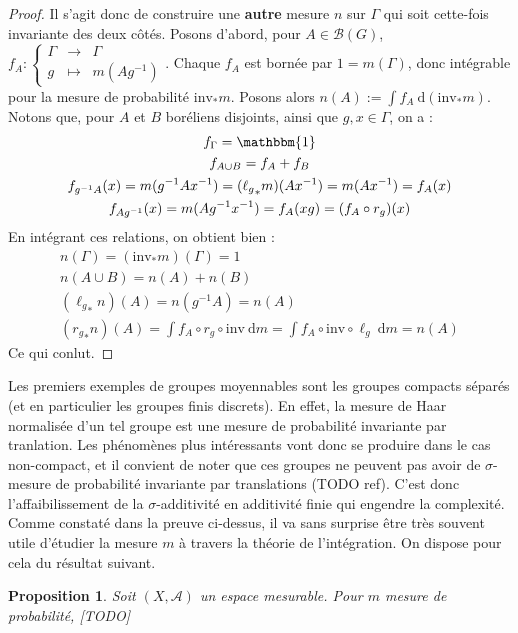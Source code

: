 \documentclass[a4paper,12pt]{article}
\newtheorem{proposition}[theorem]{Proposition}
\newcommand{\Bor}{\mathcal{B}}
\newcommand{\indic}{\mathbbm{1}}
\newcommand{\integral}[2]{\int #1~\mathrm{d}#2}
\newcommand\fundef[3]{#1: \left\{\begin{array}{ccc}#2\\#3\end{array}\right.}
\newcommand{\inv}{^{-1}}
\newcommand{\comp}{\circ}
\newcommand{\invop}{\mathrm{inv}}
\begin{document}
\begin{proof}
    Il s'agit donc de construire une \textbf{autre} mesure $n$ sur $\Gamma$ qui soit cette-fois invariante des deux côtés.
    Posons d'abord, pour $A\in\Bor(G)$, $\fundef{f_A}{\Gamma&\to& \Gamma}{g&\mapsto& m(Ag\inv)}$. Chaque $f_A$ est bornée par $1 = m(\Gamma)$, 
    donc intégrable pour la mesure de probabilité $\invop_*m$. Posons alors $n(A) := \integral{f_A}{(\invop_*m)}$. \\
    Notons que, pour $A$ et $B$ boréliens disjoints, ainsi que $g, x\in\Gamma$, on a :
    \begin{gather*}
        f_\Gamma = \indic \\
        f_{A\cup B} = f_A + f_B \\
        f_{g\inv A}(x) = m(g\inv Ax\inv) = ({\ell_g}_*m)(Ax\inv) = m(Ax\inv) = f_A(x) \\
        f_{Ag\inv}(x) = m(Ag\inv x\inv) = f_A(xg) = (f_A \comp r_g)(x)
    \end{gather*}
    En intégrant ces relations, on obtient bien :
    \begin{gather*}
        n(\Gamma) = (\invop_*m)(\Gamma) = 1 \\
        n(A\cup B) = n(A) + n(B) \\
        ({\ell_g}_*n)(A) = n(g\inv A) = n(A) \\
        ({r_g}_*n)(A) = \integral{f_A\comp r_g\comp\invop}{m} = \integral{f_A\comp\invop\comp \ell_g}{m} = n(A)
    \end{gather*}
    Ce qui conlut.
\end{proof}

Les premiers exemples de groupes moyennables sont les groupes compacts séparés (et en particulier les groupes finis discrets).
En effet, la mesure de Haar normalisée d'un tel groupe est une mesure de probabilité invariante par tranlation. Les phénomènes
plus intéressants vont donc se produire dans le cas non-compact, et il convient de noter que ces groupes ne peuvent pas avoir
de $\sigma$-mesure de probabilité invariante par translations (TODO ref). C'est donc l'affaibilissement de la 
$\sigma$-additivité en additivité finie qui engendre la complexité. \\

Comme constaté dans la preuve ci-dessus, il va sans surprise être très souvent utile d'étudier la mesure $m$ à travers la théorie de l'intégration.
On dispose pour cela du résultat suivant.
\begin{proposition}\label{repr}
    Soit $(X, \mathcal{A})$ un espace mesurable. Pour $m$ mesure de probabilité, [TODO]
\end{proposition}
\end{document}
